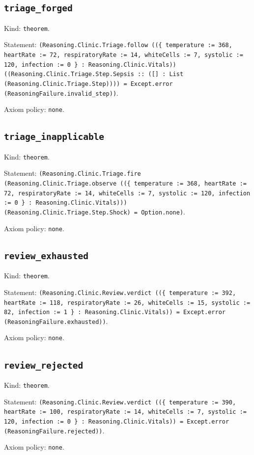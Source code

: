 \documentclass[11pt]{article}
\begin{document}
\subsection*{\texttt{triage\_forged}}
\noindent Kind: \texttt{theorem}.\par
\noindent Statement: \texttt{(Reasoning.Clinic.Triage.follow ((\{ temperature := 368, heartRate := 72, respiratoryRate := 14, whiteCells := 7, systolic := 120, infection := 0 \} : Reasoning.Clinic.Vitals)) ((Reasoning.Clinic.Triage.Step.Sepsis :: ([] : List (Reasoning.Clinic.Triage.Step)))) = Except.error (ReasoningFailure.invalid\_step))}.\par
\noindent Axiom policy: \texttt{none}.\par
\subsection*{\texttt{triage\_inapplicable}}
\noindent Kind: \texttt{theorem}.\par
\noindent Statement: \texttt{(Reasoning.Clinic.Triage.fire (Reasoning.Clinic.Triage.observe ((\{ temperature := 368, heartRate := 72, respiratoryRate := 14, whiteCells := 7, systolic := 120, infection := 0 \} : Reasoning.Clinic.Vitals))) (Reasoning.Clinic.Triage.Step.Shock) = Option.none)}.\par
\noindent Axiom policy: \texttt{none}.\par
\subsection*{\texttt{review\_exhausted}}
\noindent Kind: \texttt{theorem}.\par
\noindent Statement: \texttt{(Reasoning.Clinic.Review.verdict ((\{ temperature := 392, heartRate := 118, respiratoryRate := 26, whiteCells := 15, systolic := 82, infection := 1 \} : Reasoning.Clinic.Vitals)) = Except.error (ReasoningFailure.exhausted))}.\par
\noindent Axiom policy: \texttt{none}.\par
\subsection*{\texttt{review\_rejected}}
\noindent Kind: \texttt{theorem}.\par
\noindent Statement: \texttt{(Reasoning.Clinic.Review.verdict ((\{ temperature := 390, heartRate := 100, respiratoryRate := 14, whiteCells := 7, systolic := 120, infection := 0 \} : Reasoning.Clinic.Vitals)) = Except.error (ReasoningFailure.rejected))}.\par
\noindent Axiom policy: \texttt{none}.\par
\end{document}
